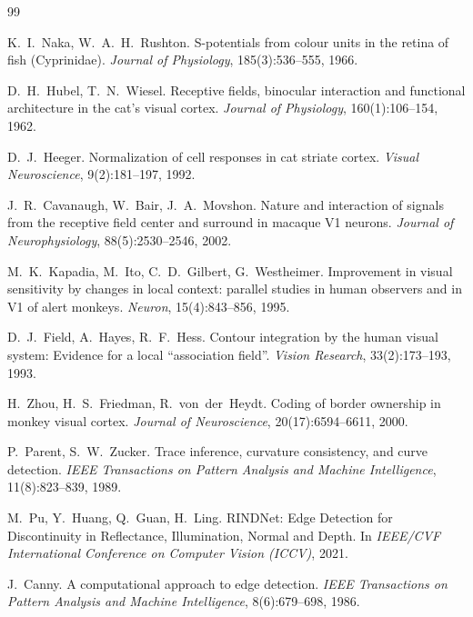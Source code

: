 \documentclass[11pt,a4paper]{article}
\begin{document}
\begin{thebibliography}{99}

K.~I.~Naka, W.~A.~H.~Rushton.
\newblock S-potentials from colour units in the retina of fish (Cyprinidae).
\newblock \emph{Journal of Physiology}, 185(3):536--555, 1966.

D.~H.~Hubel, T.~N.~Wiesel.
\newblock Receptive fields, binocular interaction and functional architecture in the cat's visual cortex.
\newblock \emph{Journal of Physiology}, 160(1):106--154, 1962.

D.~J.~Heeger.
\newblock Normalization of cell responses in cat striate cortex.
\newblock \emph{Visual Neuroscience}, 9(2):181--197, 1992.

J.~R.~Cavanaugh, W.~Bair, J.~A.~Movshon.
\newblock Nature and interaction of signals from the receptive field center and surround in macaque V1 neurons.
\newblock \emph{Journal of Neurophysiology}, 88(5):2530--2546, 2002.

M.~K.~Kapadia, M.~Ito, C.~D.~Gilbert, G.~Westheimer.
\newblock Improvement in visual sensitivity by changes in local context: parallel studies in human observers and in V1 of alert monkeys.
\newblock \emph{Neuron}, 15(4):843--856, 1995.

D.~J.~Field, A.~Hayes, R.~F.~Hess.
\newblock Contour integration by the human visual system: Evidence for a local ``association field''.
\newblock \emph{Vision Research}, 33(2):173--193, 1993.

H.~Zhou, H.~S.~Friedman, R.~von~der~Heydt.
\newblock Coding of border ownership in monkey visual cortex.
\newblock \emph{Journal of Neuroscience}, 20(17):6594--6611, 2000.

P.~Parent, S.~W.~Zucker.
\newblock Trace inference, curvature consistency, and curve detection.
\newblock \emph{IEEE Transactions on Pattern Analysis and Machine Intelligence}, 11(8):823--839, 1989.

M.~Pu, Y.~Huang, Q.~Guan, H.~Ling.
\newblock RINDNet: Edge Detection for Discontinuity in Reflectance, Illumination, Normal and Depth.
\newblock In \emph{IEEE/CVF International Conference on Computer Vision (ICCV)}, 2021.

J.~Canny.
\newblock A computational approach to edge detection.
\newblock \emph{IEEE Transactions on Pattern Analysis and Machine Intelligence}, 8(6):679--698, 1986.


\end{thebibliography}
\end{document}
